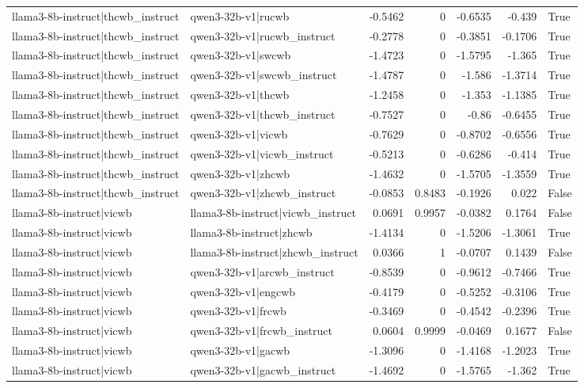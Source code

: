 \begin{table}
\begin{tabular}{l l r r r r l}
llama3-8b-instruct|thcwb_instruct & qwen3-32b-v1|rucwb & -0.5462 & 0 & -0.6535 & -0.439 & True \\
llama3-8b-instruct|thcwb_instruct & qwen3-32b-v1|rucwb_instruct & -0.2778 & 0 & -0.3851 & -0.1706 & True \\
llama3-8b-instruct|thcwb_instruct & qwen3-32b-v1|swcwb & -1.4723 & 0 & -1.5795 & -1.365 & True \\
llama3-8b-instruct|thcwb_instruct & qwen3-32b-v1|swcwb_instruct & -1.4787 & 0 & -1.586 & -1.3714 & True \\
llama3-8b-instruct|thcwb_instruct & qwen3-32b-v1|thcwb & -1.2458 & 0 & -1.353 & -1.1385 & True \\
llama3-8b-instruct|thcwb_instruct & qwen3-32b-v1|thcwb_instruct & -0.7527 & 0 & -0.86 & -0.6455 & True \\
llama3-8b-instruct|thcwb_instruct & qwen3-32b-v1|vicwb & -0.7629 & 0 & -0.8702 & -0.6556 & True \\
llama3-8b-instruct|thcwb_instruct & qwen3-32b-v1|vicwb_instruct & -0.5213 & 0 & -0.6286 & -0.414 & True \\
llama3-8b-instruct|thcwb_instruct & qwen3-32b-v1|zhcwb & -1.4632 & 0 & -1.5705 & -1.3559 & True \\
llama3-8b-instruct|thcwb_instruct & qwen3-32b-v1|zhcwb_instruct & -0.0853 & 0.8483 & -0.1926 & 0.022 & False \\
llama3-8b-instruct|vicwb & llama3-8b-instruct|vicwb_instruct & 0.0691 & 0.9957 & -0.0382 & 0.1764 & False \\
llama3-8b-instruct|vicwb & llama3-8b-instruct|zhcwb & -1.4134 & 0 & -1.5206 & -1.3061 & True \\
llama3-8b-instruct|vicwb & llama3-8b-instruct|zhcwb_instruct & 0.0366 & 1 & -0.0707 & 0.1439 & False \\
llama3-8b-instruct|vicwb & qwen3-32b-v1|arcwb_instruct & -0.8539 & 0 & -0.9612 & -0.7466 & True \\
llama3-8b-instruct|vicwb & qwen3-32b-v1|engcwb & -0.4179 & 0 & -0.5252 & -0.3106 & True \\
llama3-8b-instruct|vicwb & qwen3-32b-v1|frcwb & -0.3469 & 0 & -0.4542 & -0.2396 & True \\
llama3-8b-instruct|vicwb & qwen3-32b-v1|frcwb_instruct & 0.0604 & 0.9999 & -0.0469 & 0.1677 & False \\
llama3-8b-instruct|vicwb & qwen3-32b-v1|gacwb & -1.3096 & 0 & -1.4168 & -1.2023 & True \\
llama3-8b-instruct|vicwb & qwen3-32b-v1|gacwb_instruct & -1.4692 & 0 & -1.5765 & -1.362 & True \\

\end{tabular}
\end{table}
